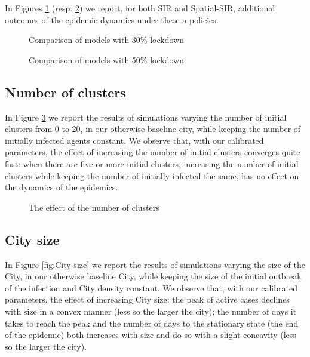 \documentclass[english,11pt]{article}
\begin{document}
In Figures \ref{fig:policy-all-30} (resp. \ref{fig:policy-all-50}) 
we report, for both SIR and Spatial-SIR,  additional outcomes of the epidemic dynamics under these a policies. 

\begin{figure}[H]
    \caption{Comparison of models with 30\% lockdown}
    \label{fig:policy-all-30}
\end{figure}

\begin{figure}[H]
    \caption{Comparison of models with 50\% lockdown}
    \label{fig:policy-all-50}
\end{figure}

\subsection{Number of clusters}
In Figure \ref{fig:ncluster} we report the results of  simulations varying the number
of initial clusters from 0 to 20, in our otherwise baseline city, while keeping the number of initially infected agents constant. 
We observe that, with our calibrated parameters,  the effect of increasing the number of initial
clusters converges quite fast:
when there are five or more initial clusters, %
increasing the 
number of initial clusters while keeping the number of initially infected the same, has no effect on the dynamics of the epidemics. 

\begin{figure}[H]
\caption{The effect of the number of clusters\label{fig:ncluster}}
\centering{}
\end{figure}

\subsection{City size}
 In Figure \ref{fig:City-size} we report the results of 
    simulations varying the size of the City, in our otherwise baseline City,  while keeping the size of the initial outbreak of the infection and City density constant. 
We observe that, with our calibrated parameters,  the effect of increasing City size: the peak of active cases declines with size in a convex manner (less so the larger the city); the number of days it takes to reach the  peak  and the number of days to the stationary state (the end of the epidemic) both increases with size and do so with a slight concavity (less so the larger the city). 
\end{document}
